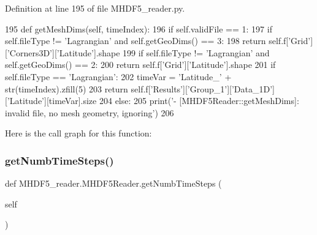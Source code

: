 Definition at line 195 of file M\+H\+D\+F5\+\_\+reader.\+py.


\begin{DoxyCode}
195     \textcolor{keyword}{def }getMeshDims(self, timeIndex):
196         \textcolor{keywordflow}{if} self.validFile == 1:
197             \textcolor{keywordflow}{if} self.fileType != \textcolor{stringliteral}{'Lagrangian'} \textcolor{keywordflow}{and} self.getGeoDims() == 3:
198                 \textcolor{keywordflow}{return} self.f[\textcolor{stringliteral}{'Grid'}][\textcolor{stringliteral}{'Corners3D'}][\textcolor{stringliteral}{'Latitude'}].shape
199             \textcolor{keywordflow}{if} self.fileType != \textcolor{stringliteral}{'Lagrangian'} \textcolor{keywordflow}{and} self.getGeoDims() == 2:
200                 \textcolor{keywordflow}{return} self.f[\textcolor{stringliteral}{'Grid'}][\textcolor{stringliteral}{'Latitude'}].shape
201             \textcolor{keywordflow}{if} self.fileType == \textcolor{stringliteral}{'Lagrangian'}:
202                 timeVar = \textcolor{stringliteral}{'Latitude\_'} + str(timeIndex).zfill(5)
203                 \textcolor{keywordflow}{return} self.f[\textcolor{stringliteral}{'Results'}][\textcolor{stringliteral}{'Group\_1'}][\textcolor{stringliteral}{'Data\_1D'}][\textcolor{stringliteral}{'Latitude'}][timeVar].size
204         \textcolor{keywordflow}{else}:
205             print(\textcolor{stringliteral}{'- [MHDF5Reader::getMeshDims]: invalid file, no mesh geometry, ignoring'})
206             
\end{DoxyCode}
Here is the call graph for this function\+:
\mbox{\label{class_m_h_d_f5__reader_1_1_m_h_d_f5_reader_a5ba881e026e00f66ea31d212dd0be87b}} 
\subsubsection{\texorpdfstring{get\+Numb\+Time\+Steps()}{getNumbTimeSteps()}}
{\footnotesize\ttfamily def M\+H\+D\+F5\+\_\+reader.\+M\+H\+D\+F5\+Reader.\+get\+Numb\+Time\+Steps (\begin{DoxyParamCaption}\item[{}]{self }\end{DoxyParamCaption})}



